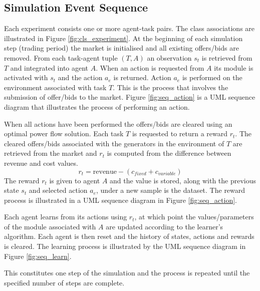 \subsection{Simulation Event Sequence}
%
Each experiment consists one or more agent-task pairs. The class associations
are illustrated in Figure \ref{fig:cls_experiment}.
%
At the beginning of each simulation step (trading period) the market is
initialised and all existing offers/bids are removed.  From each task-agent tuple $(T,A)$ an
observation $s_t$ is retrieved from $T$ and integrated into agent $A$.  When
an action is requested from $A$ its module is activated with $s_t$ and the
action $a_e$ is returned.  Action $a_e$ is performed on the environment
associated with task $T$.  This is the process that involves the submission of
offer/bids to the market.  Figure \ref{fig:seq_action} is a UML sequence
diagram that illustrates the process of performing an action.

%

When all actions have been performed the offers/bids are cleared using an
optimal power flow solution.  Each task $T$ is requested to return a reward
$r_t$. The cleared offers/bids associated with the generators in the environment of $T$ are retrieved from the market and $r_t$ is computed from
the difference between revenue and cost values.
\begin{equation}
r_t = \mbox{revenue} - (c_{fixed} + c_{variable})
\end{equation}
The reward $r_t$ is given to agent $A$ and the value is stored, along with the
previous state $s_t$ and selected action $a_e$, under a new sample is the
dataset.  The reward process is illustrated in a UML sequence diagram in Figure
\ref{fig:seq_action}.

%

Each agent learns from its actions using $r_t$, at which point the
values/parameters of the module associated with $A$ are updated according to
the learner's algorithm.  Each agent is then reset and the history of states,
actions and rewards is cleared.  The learning process is illustrated by the UML
sequence diagram in  Figure \ref{fig:seq_learn}.

This constitutes one step of the simulation and the process is repeated
until the specified number of steps are complete.

